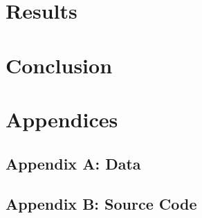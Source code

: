 \documentclass[a4paper]{article}
\begin{document}


\section{Results}

\section{Conclusion}

\section{Appendices}

\subsection{Appendix A: Data}

\subsection{Appendix B: Source Code}
\end{document}

